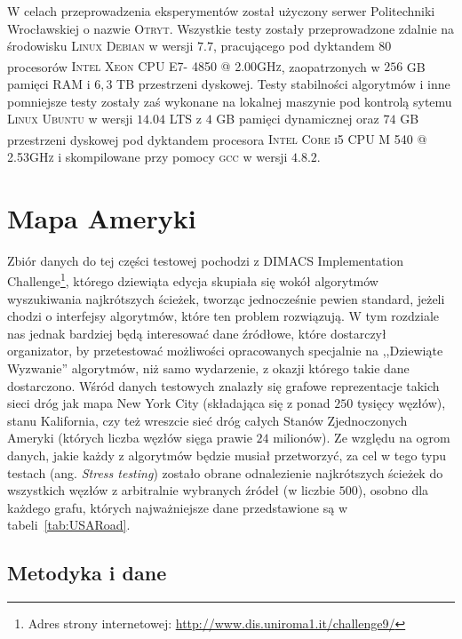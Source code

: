 W celach przeprowadzenia eksperymentów został użyczony serwer Politechniki Wrocławskiej o nazwie \textsc{Otryt}.
Wszystkie testy zostały przeprowadzone zdalnie na środowisku \textsc{Linux Debian} w wersji $7.7$, pracującego pod dyktandem $80$ procesorów \textsc{Intel\textsuperscript{\textregistered} Xeon\textsuperscript{\textregistered} CPU E7- 4850  @ 2.00GHz}, zaopatrzonych w $256$ \textsc{GB} pamięci \textsc{RAM} i $6,3$ \textsc{TB} przestrzeni dyskowej.
Testy stabilności algorytmów i inne pomniejsze testy zostały zaś wykonane na lokalnej maszynie pod kontrolą sytemu \textsc{Linux Ubuntu} w wersji $14.04$ \textsc{LTS} z $4$ \textsc{GB} pamięci dynamicznej oraz $74$ \textsc{GB} przestrzeni dyskowej pod dyktandem procesora \textsc{Intel\textsuperscript{\textregistered} Core\textsuperscript{\texttrademark} i5 CPU M 540  @ 2.53GHz} i skompilowane przy pomocy \textsc{gcc} w wersji $4.8.2$.




\section{Mapa Ameryki}




Zbiór danych do tej części testowej pochodzi z \textsf{DIMACS Implementation Challenge}\footnote{
	Adres strony internetowej: \url{http://www.dis.uniroma1.it/challenge9/}
}, którego dziewiąta edycja skupiała się wokół algorytmów wyszukiwania najkrótszych ścieżek, tworząc jednocześnie pewien standard, jeżeli chodzi o interfejsy algorytmów, które ten problem rozwiązują.
W tym rozdziale nas jednak bardziej będą interesować dane źródłowe, które dostarczył organizator, by przetestować możliwości opracowanych specjalnie na ,,Dziewiąte Wyzwanie'' algorytmów, niż samo wydarzenie, z okazji którego takie dane dostarczono.
Wśród danych testowych znalazły się grafowe reprezentacje takich sieci dróg jak mapa New York City (składająca się z ponad $250$ tysięcy węzłów), stanu Kalifornia, czy też wreszcie sieć dróg całych Stanów Zjednoczonych Ameryki (których liczba węzłów sięga prawie $24$ milionów).
Ze względu na ogrom danych, jakie każdy z algorytmów będzie musiał przetworzyć, za cel w tego typu testach (ang. \textit{Stress testing}) zostało obrane odnalezienie najkrótszych ścieżek do wszystkich węzłów z arbitralnie wybranych źródeł (w liczbie $500$), osobno dla każdego grafu, których najważniejsze dane przedstawione są w tabeli~\ref{tab:USARoad}.



\subsection{Metodyka i dane}




